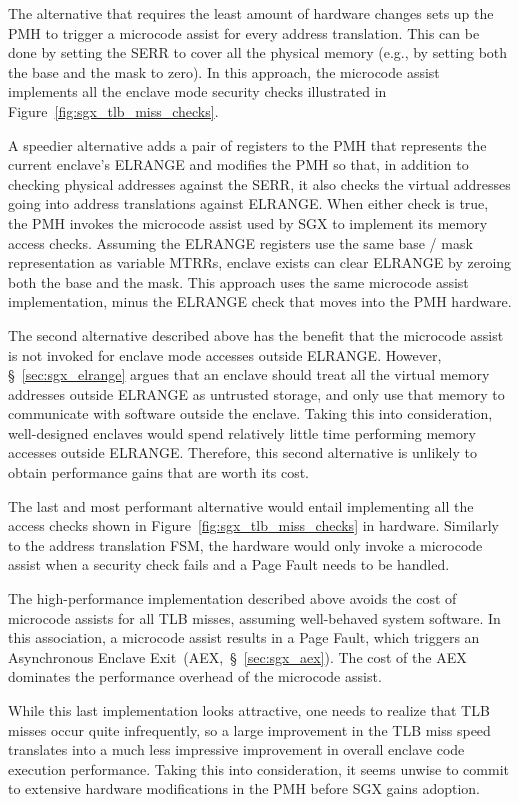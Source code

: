 The alternative that requires the least amount of hardware changes sets up the
PMH to trigger a microcode assist for every address translation. This can be
done by setting the SERR to cover all the physical memory (e.g., by setting
both the base and the mask to zero). In this approach, the microcode assist
implements all the enclave mode security checks illustrated in
Figure~\ref{fig:sgx_tlb_miss_checks}.

A speedier alternative adds a pair of registers to the PMH that represents the
current enclave's ELRANGE and modifies the PMH so that, in addition to checking
physical addresses against the SERR, it also checks the virtual addresses
going into address translations against ELRANGE. When either check is true, the
PMH invokes the microcode assist used by SGX to implement its memory access
checks. Assuming the ELRANGE registers use the same base / mask representation
as variable MTRRs, enclave exists can clear ELRANGE by zeroing both the base
and the mask. This approach uses the same microcode assist implementation,
minus the ELRANGE check that moves into the PMH hardware.

The second alternative described above has the benefit that the microcode
assist is not invoked for enclave mode accesses outside ELRANGE. However,
\S~\ref{sec:sgx_elrange} argues that an enclave should treat all the virtual
memory addresses outside ELRANGE as untrusted storage, and only use that memory
to communicate with software outside the enclave. Taking this into
consideration, well-designed enclaves would spend relatively little time
performing memory accesses outside ELRANGE. Therefore, this second alternative
is unlikely to obtain performance gains that are worth its cost.

The last and most performant alternative would entail implementing all the
access checks shown in Figure~\ref{fig:sgx_tlb_miss_checks} in hardware.
Similarly to the address translation FSM, the hardware would only invoke a
microcode assist when a security check fails and a Page Fault needs to be
handled.

The high-performance implementation described above avoids the cost of
microcode assists for all TLB misses, assuming well-behaved system software.
In this association, a microcode assist results in a Page Fault, which triggers
an Asynchronous Enclave Exit~(AEX,~\S~\ref{sec:sgx_aex}). The cost of the AEX
dominates the performance overhead of the microcode assist.

While this last implementation looks attractive, one needs to realize that
TLB misses occur quite infrequently, so a large improvement in the TLB miss
speed translates into a much less impressive improvement in overall enclave
code execution performance. Taking this into consideration, it seems unwise to
commit to extensive hardware modifications in the PMH before SGX gains
adoption.


